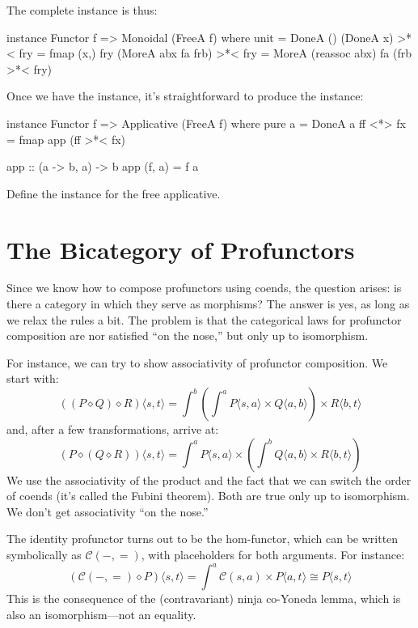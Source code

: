 \documentclass[DaoFP]{subfiles}
\begin{document}
The complete instance is thus:
\begin{haskell}
instance Functor f => Monoidal (FreeA f) where
  unit = DoneA ()
  (DoneA x) >*< fry = fmap (x,) fry
  (MoreA abx fa frb) >*< fry = MoreA (reassoc abx) fa (frb >*< fry)
\end{haskell}

Once we have the  instance, it's straightforward to produce the  instance:
\begin{haskell}
instance Functor f => Applicative (FreeA f) where
  pure a = DoneA a
  ff <*> fx = fmap app (ff >*< fx)
  
app :: (a -> b, a) -> b
app (f, a) = f a
\end{haskell}

\begin{exercise}
Define the  instance for the free applicative.
\end{exercise}


\section{The Bicategory of Profunctors}

Since we know how to compose profunctors using coends, the question arises: is there a category in which they serve as morphisms? The answer is yes, as long as we relax the rules a bit. The problem is that the categorical laws for profunctor composition are nor satisfied ``on the nose,'' but only up to isomorphism. 

For instance, we can try to show associativity of profunctor composition. We start with:
\[ ((P \diamond Q) \diamond R) \langle s, t \rangle = \int^b \left( \int^a P \langle s, a \rangle \times Q \langle a, b \rangle \right) \times R \langle b,  t \rangle \]
and, after a few transformations, arrive at:
\[ (P \diamond (Q \diamond R)) \langle s, t \rangle =  \int^a P \langle s, a \rangle \times \left( \int^b Q \langle a, b \rangle \times R \langle b,  t \rangle \right) \]
We use the associativity of the product and the fact that we can switch the order of coends (it's called the  Fubini theorem). Both are true only up to isomorphism. We don't get associativity ``on the nose.''

The identity profunctor turns out to be the hom-functor, which can be written symbolically as $\mathcal{C}(-, =)$, with placeholders for both arguments. For instance:
\[ \left( \mathcal{C}(-, =) \diamond P \right) \langle s, t \rangle = \int^a  \mathcal{C}(s, a) \times P \langle a, t \rangle \cong P \langle s, t \rangle \]
This is the consequence of the (contravariant) ninja co-Yoneda lemma, which is also an isomorphism---not an equality.
\end{document}
